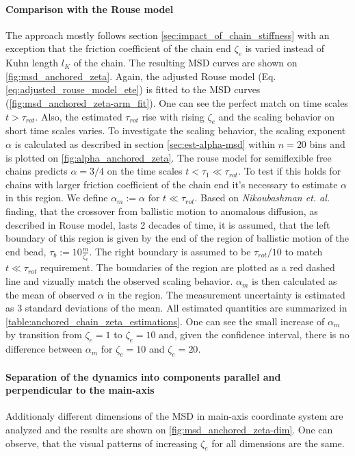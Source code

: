 \documentclass[
    paper=A4,pagesize=automedia,fontsize=12pt,
    BCOR=15mm,DIV=22,
    twoside,headinclude,footinclude=false,
    fleqn,             %
    bibliography=totocnumbered,          %
    listof=totoc,                %
    listof=flat,                 %
    cleardoublepage=empty      %
    numbers=endperiod
]{scrartcl}
\begin{document}
\paragraph{Comparison with the Rouse model}
The approach mostly follows section \ref{sec:impact_of_chain_stiffness} with an exception that
the friction coefficient of the chain end $\zeta_e$ is varied instead of Kuhn length $l_K$ 
of the chain. The resulting MSD curves are shown on 
\autoref{fig:msd_anchored_zeta}. Again, the adjusted Rouse model 
(Eq. \ref{eq:adjusted_rouse_model_ete}) is fitted to
the MSD curves (\autoref{fig:msd_anchored_zeta-arm_fit}). One can see
the perfect match on time scales $t > \tau_{rot}$. Also, the estimated $\tau_{rot}$
rise with rising $\zeta_e$ and the scaling behavior on short time scales 
varies. To investigate the scaling behavior, the scaling exponent $\alpha$ is
calculated as described in section \ref{sec:est-alpha-msd} 
within $n=20$ bins and is plotted on \autoref{fig:alpha_anchored_zeta}.
The rouse model for semiflexible free chains predicts $\alpha=3/4$ on the
time scales $t < \tau_{1} \ll \tau_{rot}$. To test if this holds for chains with larger
friction coefficient of the chain end it's necessary to estimate $\alpha$ in this
region. We define $\alpha_m := \alpha \text{ for } t \ll \tau_{rot}$.
Based on \emph{Nikoubashman et. al.} \cite{Nikoubashman2016} finding,
that the crossover from ballistic motion to anomalous diffusion, as described 
in Rouse model, lasts 2 decades of time, it is assumed, 
that the left boundary of this region is given by the end of the region of ballistic
motion of the end bead, $\tau_b  := 10 \frac{m}{\zeta_e}$. The right boundary is
assumed to be $\tau_{rot} / 10$ to match $t \ll \tau_{rot}$ requirement.
The boundaries of the region are plotted as a red dashed line and vizually match
the observed scaling behavior. $\alpha_m$ is then calculated as the mean
of observed $\alpha$ in the region. The measurement uncertainty is estimated
as 3 standard deviations of the mean. All estimated quantities are summarized
in \autoref{table:anchored_chain_zeta_estimations}. One can see the 
small increase of $\alpha_m$ by transition from $\zeta_e=1$ to $\zeta_e=10$ and, 
given the confidence interval, there is no difference between 
$\alpha_m$ for $\zeta_e = 10$ and $\zeta_e=20$.

\paragraph{Separation of the dynamics into components parallel and perpendicular to
the main-axis}
Additionaly different dimensions of the MSD in main-axis coordinate system are
analyzed and the results are shown on \autoref{fig:msd_anchored_zeta-dim}.
One can observe, that the visual patterns of 
increasing $\zeta_e$ for all dimensions are the same.
\end{document}

